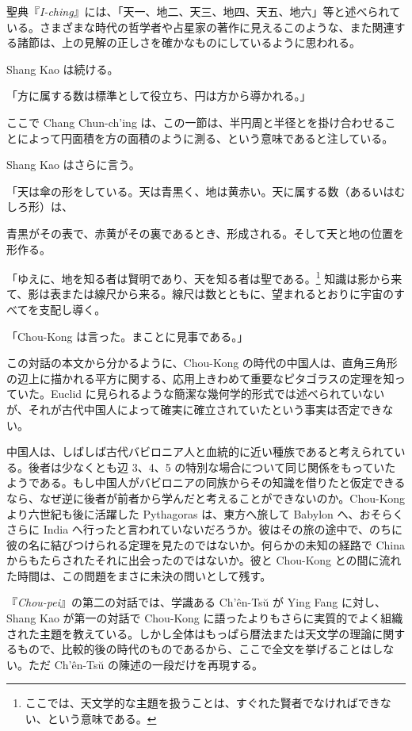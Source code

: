 \documentclass[11pt]{article}
\newcommand{\scanpage}[2]{\clearpage\setcounter{footnote}{0}\noindent{\footnotesize\color{gray}PDF #1 頁 · #2}\par\medskip}
\newcommand{\scanfooter}{}
\begin{document}
聖典『\emph{I-ching}』には、「天一、地二、天三、地四、天五、地六」等と述べられている。さまざまな時代の哲学者や占星家の著作に見えるこのような、また関連する諸節は、上の見解の正しさを確かなものにしているように思われる。

Shang Kao は続ける。

「方に属する数は標準として役立ち、円は方から導かれる。」

ここで Chang Chun-ch'ing は、この一節は、半円周と半径とを掛け合わせることによって円面積を方の面積のように測る、という意味であると注している。

Shang Kao はさらに言う。

「天は傘の形をしている。天は青黒く、地は黄赤い。天に属する数（あるいはむしろ形）は、
\scanfooter

\scanpage{0021}{第二章、印刷頁7}
\setcounter{footnote}{0}
青黒がその表で、赤黄がその裏であるとき、形成される。そして天と地の位置を形作る。

「ゆえに、地を知る者は賢明であり、天を知る者は聖である。\footnote{ここでは、天文学的な主題を扱うことは、すぐれた賢者でなければできない、という意味である。} 知識は影から来て、影は表または線尺から来る。線尺は数とともに、望まれるとおりに宇宙のすべてを支配し導く。

「Chou-Kong は言った。まことに見事である。」

この対話の本文から分かるように、Chou-Kong の時代の中国人は、直角三角形の辺上に描かれる平方に関する、応用上きわめて重要なピタゴラスの定理を知っていた。Euclid に見られるような簡潔な幾何学的形式では述べられていないが、それが古代中国人によって確実に確立されていたという事実は否定できない。

中国人は、しばしば古代バビロニア人と血統的に近い種族であると考えられている。後者は少なくとも辺 3、4、5 の特別な場合について同じ関係をもっていたようである。もし中国人がバビロニアの同族からその知識を借りたと仮定できるなら、なぜ逆に後者が前者から学んだと考えることができないのか。Chou-Kong より六世紀も後に活躍した Pythagoras は、東方へ旅して Babylon へ、おそらくさらに India へ行ったと言われていないだろうか。彼はその旅の途中で、のちに彼の名に結びつけられる定理を見たのではないか。何らかの未知の経路で China からもたらされたそれに出会ったのではないか。彼と Chou-Kong との間に流れた時間は、この問題をまさに未決の問いとして残す。

『\emph{Chou-pei}』の第二の対話では、学識ある Ch'ên-Tsŭ が Ying Fang に対し、Shang Kao が第一の対話で Chou-Kong に語ったよりもさらに実質的でよく組織された主題を教えている。しかし全体はもっぱら暦法または天文学の理論に関するもので、比較的後の時代のものであるから、ここで全文を挙げることはしない。ただ Ch'ên-Tsŭ の陳述の一段だけを再現する。
\end{document}
